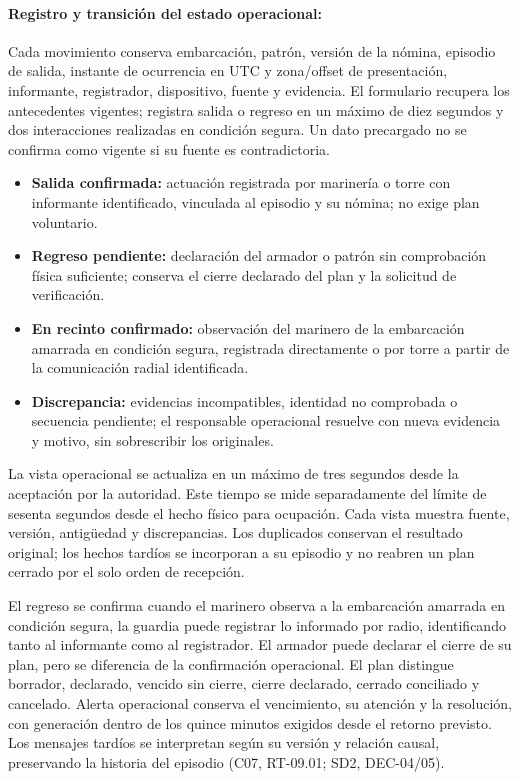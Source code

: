 \paragraph{Registro y transición del estado operacional:}
Cada movimiento conserva embarcación, patrón, versión de la nómina, episodio de salida, instante de ocurrencia en UTC y zona/offset de presentación, informante, registrador, dispositivo, fuente y evidencia. El formulario recupera los antecedentes vigentes; registra salida o regreso en un máximo de diez segundos y dos interacciones realizadas en condición segura. Un dato precargado no se confirma como vigente si su fuente es contradictoria.
\begin{itemize}
\item \textbf{Salida confirmada:} actuación registrada por marinería o torre con informante identificado, vinculada al episodio y su nómina; no exige plan voluntario.
\item \textbf{Regreso pendiente:} declaración del armador o patrón sin comprobación física suficiente; conserva el cierre declarado del plan y la solicitud de verificación.
\item \textbf{En recinto confirmado:} observación del marinero de la embarcación amarrada en condición segura, registrada directamente o por torre a partir de la comunicación radial identificada.
\item \textbf{Discrepancia:} evidencias incompatibles, identidad no comprobada o secuencia pendiente; el responsable operacional resuelve con nueva evidencia y motivo, sin sobrescribir los originales.
\end{itemize}
La vista operacional se actualiza en un máximo de tres segundos desde la aceptación por la autoridad. Este tiempo se mide separadamente del límite de sesenta segundos desde el hecho físico para ocupación. Cada vista muestra fuente, versión, antigüedad y discrepancias. Los duplicados conservan el resultado original; los hechos tardíos se incorporan a su episodio y no reabren un plan cerrado por el solo orden de recepción.

El regreso se confirma cuando el marinero observa a la embarcación amarrada en condición segura, la guardia puede registrar lo informado por radio, identificando tanto al informante como al registrador. El armador puede declarar el cierre de su plan, pero se diferencia de la confirmación operacional. El plan distingue borrador, declarado, vencido sin cierre, cierre declarado, cerrado conciliado y cancelado. Alerta operacional conserva el vencimiento, su atención y la resolución, con generación dentro de los quince minutos exigidos desde el retorno previsto. Los mensajes tardíos se interpretan según su versión y relación causal, preservando la historia del episodio (C07, RT-09.01; SD2, DEC-04/05).

